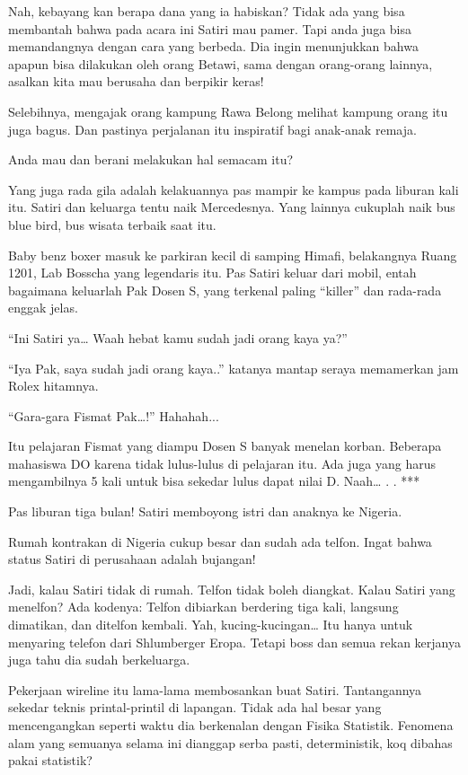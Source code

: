 Nah, kebayang kan berapa dana yang ia habiskan? Tidak ada yang bisa membantah bahwa pada acara ini Satiri mau pamer. Tapi anda juga bisa memandangnya dengan cara yang berbeda. Dia ingin menunjukkan bahwa apapun bisa dilakukan oleh orang Betawi, sama dengan orang-orang lainnya, asalkan kita mau berusaha dan berpikir keras!

Selebihnya, mengajak orang kampung Rawa Belong melihat kampung orang itu juga bagus. Dan pastinya perjalanan itu inspiratif bagi anak-anak remaja.

Anda mau dan berani melakukan hal semacam itu?

Yang juga rada gila adalah kelakuannya pas mampir ke kampus pada liburan kali itu. Satiri dan keluarga tentu naik Mercedesnya. Yang lainnya cukuplah naik bus blue bird, bus wisata terbaik saat itu.

Baby benz boxer masuk ke parkiran kecil di samping Himafi, belakangnya Ruang 1201, Lab Bosscha yang legendaris itu. Pas Satiri keluar dari mobil, entah bagaimana keluarlah Pak Dosen S, yang terkenal paling “killer” dan rada-rada enggak jelas.

“Ini Satiri ya… Waah hebat kamu sudah jadi orang kaya ya?”

“Iya Pak, saya sudah jadi orang kaya..” katanya mantap seraya memamerkan jam Rolex hitamnya.

“Gara-gara Fismat Pak…!” Hahahah...

Itu pelajaran Fismat yang diampu Dosen S banyak menelan korban. Beberapa mahasiswa DO karena tidak lulus-lulus di pelajaran itu. Ada juga yang harus mengambilnya 5 kali untuk bisa sekedar lulus dapat nilai D. Naah…
.
.
***

Pas liburan tiga bulan! Satiri memboyong istri dan anaknya ke Nigeria.

Rumah kontrakan di Nigeria cukup besar dan sudah ada telfon. Ingat bahwa status Satiri di perusahaan adalah bujangan!

Jadi, kalau Satiri tidak di rumah. Telfon tidak boleh diangkat. Kalau Satiri yang menelfon? Ada kodenya: Telfon dibiarkan berdering tiga kali, langsung dimatikan, dan ditelfon kembali. Yah, kucing-kucingan… Itu hanya untuk menyaring telefon dari Shlumberger Eropa. Tetapi boss dan semua rekan kerjanya juga tahu dia sudah berkeluarga.

Pekerjaan wireline itu lama-lama membosankan buat Satiri. Tantangannya sekedar teknis printal-printil di lapangan. Tidak ada hal besar yang mencengangkan seperti waktu dia berkenalan dengan Fisika Statistik. Fenomena alam yang semuanya selama ini dianggap serba pasti, deterministik, koq dibahas pakai statistik?

